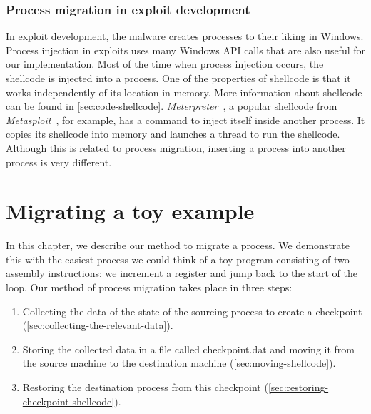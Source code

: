 \documentclass[a4paper, 11pt, english]{report}
\begin{document}
\subsection{Process migration in exploit development}
\label{sec:software-security}
In exploit development, the malware creates processes to their liking in Windows.
Process injection in exploits uses many Windows API calls that are also useful for our implementation. Most of the time when process injection occurs, the shellcode is injected into a process. One of the properties of shellcode is that it works independently of its location in memory. More information about shellcode can be found in \autoref{sec:code-shellcode}. \textit{Meterpreter}~\cite{Meterpreter}, a popular shellcode from \textit{Metasploit}~\cite{Metasploit}, for example, has a command to inject itself inside another process. It copies its shellcode into memory and launches a thread to run the shellcode. Although this is related to process migration, inserting a process into another process is very different.




\chapter{Migrating a toy example}
\label{ch:shellcode}

In this chapter, we describe our method to migrate a process. We demonstrate this with the easiest process we could think of a toy program consisting of two assembly instructions: we increment a register and jump back to the start of the loop.
Our method of process migration takes place in three steps:
\begin{enumerate}
	\item Collecting the data of the state of the sourcing process to create a checkpoint (\autoref{sec:collecting-the-relevant-data}).
	\item Storing the collected data in a file called checkpoint.dat and moving it from the source machine to the destination machine (\autoref{sec:moving-shellcode}).
	\item Restoring the destination process from this checkpoint (\autoref{sec:restoring-checkpoint-shellcode}).
\end{enumerate}
\end{document}
